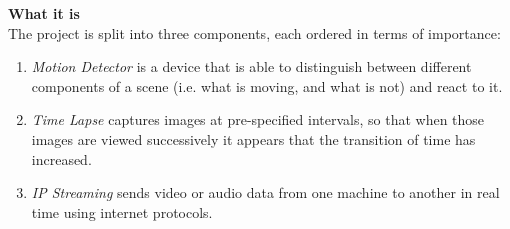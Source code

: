 \documentclass[11pt]{article} %
\begin{document}
{\large\bf What it is}\\
The project is split into three components, each ordered in terms of importance:
\begin{enumerate}
\item {\it Motion Detector} is a device that is able to distinguish between different components of a scene (i.e. what is moving, and what is not) and react to it.
\item {\it Time Lapse} captures images at pre-specified intervals, so that when those images are viewed successively it appears that the transition of time has increased.
\item {\it IP Streaming} sends video or audio data from one machine to another in real time using internet protocols.
\end{enumerate}
\end{document}

